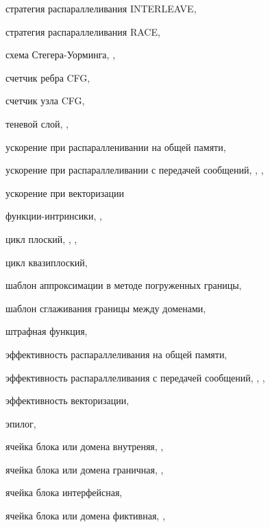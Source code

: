 стратегия распараллеливания INTERLEAVE, \pageref{term:parallel_strategy_interleave}

стратегия распараллеливания RACE, \pageref{term:parallel_strategy_race}

схема Стегера-Уорминга, \pageref{term:steger_warming_scheme}, \pageref{term:steger_warming_scheme2}

счетчик ребра CFG, \pageref{term:counter_edge}

счетчик узла CFG, \pageref{term:counter_node}

теневой слой, \pageref{term:block_shadow_layer}, \pageref{term:block_shadow_layer2}

ускорение при распаралленивании на общей памяти, \pageref{term:shr_speedup}

ускорение при распараллеливании с передачей сообщений, \pageref{term:msg_speedup}, \pageref{term:msg_speedup2}, \pageref{term:msg_speedup3}

ускорение при векторизации

функции-интринсики, \pageref{term:intrinsic}, \pageref{term:intrinsic2}

цикл плоский, \pageref{term:flat_loop}, \pageref{term:flat_loop2}, \pageref{term:flat_loop3}

цикл квазиплоский, \pageref{term:flat_kvazy_flat}

шаблон аппроксимации в методе погруженных границы, \pageref{term:ibm_template}

шаблон сглаживания границы между доменами, \pageref{term:smooth_template}

штрафная функция, \pageref{term:penalty_function}

эффективность распараллеливания на общей памяти, \pageref{term:shr_eff}

эффективность распараллеливания с передачей сообщений, \pageref{term:msg_eff}, \pageref{term:msg_eff2}, \pageref{term:msg_eff3}

эффективность векторизации, \pageref{term:vec_eff}

эпилог, \pageref{term:epilog}

ячейка блока или домена внутреняя, \pageref{term:cell_block_inner}, \pageref{term:cell_block_inner2}

ячейка блока или домена граничная, \pageref{term:cell_block_border}, \pageref{term:cell_block_border2}

ячейка блока интерфейсная, \pageref{term:cell_block_interface}

ячейка блока или домена фиктивная, \pageref{term:cell_block_ghost}, \pageref{term:cell_block_ghost2}

